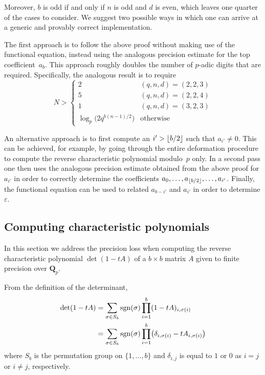 \begin{rem}
Moreover, $b$ is odd if and only if $n$ is odd and $d$ is even, which leaves 
one quarter of the cases to consider.  We suggest two possible ways in which 
one can arrive at a generic and provably correct implementation.

The first approach is to follow the above proof without making use of the 
functional equation, instead using the analogous precision estimate for the 
top coefficient~$a_b$.  This approach roughly doubles the number of $p$-adic 
digits that are required.  Specifically, the analogous result is to require 
\begin{equation*}
N > \begin{cases}
    2 & (q,n,d) = (2,2,3) \\
    5 & (q,n,d) = (2,2,4) \\
    1 & (q,n,d) = (3,2,3) \\
    \log_p \bigl( 2 q^{b (n-1) / 2} \bigr) & \text{otherwise}
    \end{cases}
\end{equation*}

An alternative approach is to first compute an $i' > \lfloor b/2\rfloor$ such 
that \mbox{$a_{i'} \neq 0$}.  This can be achieved, for example, by going 
through the entire deformation procedure to compute the reverse characteristic 
polynomial modulo~$p$ only.  In a second pass one then uses the analogous 
precision estimate obtained from the above proof for $a_{i'}$ in order to 
correctly determine the coefficients 
$a_0, \dotsc, a_{\left\lfloor b/2\right\rfloor}, \dotsc, a_{i'}$.  Finally, the functional 
equation can be used to related $a_{b-i'}$ and $a_{i'}$ in order to determine 
$\varepsilon$.
\end{rem}

\subsection{Computing characteristic polynomials}

In this section we address the precision loss when computing the reverse 
characteristic polynomial $\det(1 - t A)$ of a $b \times b$ matrix $A$ 
given to finite precision over $\mathbf{Q}_p$.

From the definition of the determinant, 
\begin{align*}
\det(1 - t A) & = \sum_{\sigma \in S_b} \operatorname{sgn}(\sigma) 
                    \prod_{i=1}^{b} (1 - t A)_{i,\sigma(i)} \\
              & = \sum_{\sigma \in S_b} \operatorname{sgn}(\sigma) 
                    \prod_{i=1}^{b} \bigl( \delta_{i,\sigma(i)} - t A_{i,\sigma(i)} \bigr)
\end{align*}
where $S_b$ is the permutation group on $\{1,\dotsc,b\}$ and $\delta_{i,j}$ 
is equal to $1$ or $0$ as $i = j$ or $i \neq j$, respectively.


